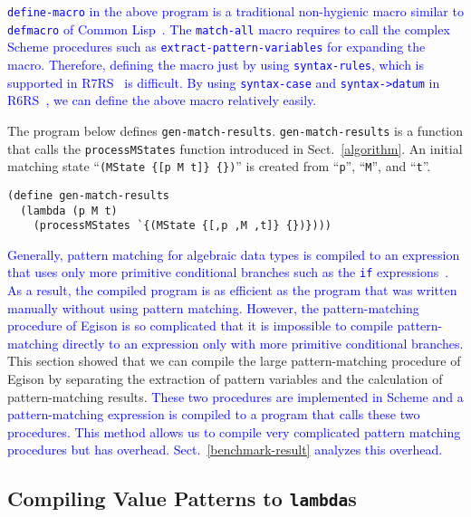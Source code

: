 \documentclass[acmlarge]{acmart}
\newcommand{\new}[1]{\textcolor{blue}{#1}}
\begin{document}
\noindent
\new{
\lstinline{define-macro} in the above program is a traditional non-hygienic macro similar to \lstinline{defmacro} of Common Lisp~\cite{gaucheTM}.
The \lstinline{match-all} macro requires to call the complex Scheme procedures such as \lstinline{extract-pattern-variables} for expanding the macro.
Therefore, defining the macro just by using \lstinline{syntax-rules}, which is supported in R7RS~\cite{shinn2013revised} is difficult.
By using \lstinline{syntax-case} and \lstinline{syntax->datum} in R6RS~\cite{sperber2009revised}, we can define the above macro relatively easily.
}%

The program below defines \lstinline{gen-match-results}.
\lstinline{gen-match-results} is a function that calls the \lstinline{processMStates} function introduced in Sect.~\ref{algorithm}.
An initial matching state ``\lstinline|(MState {[p M t]} {})|'' is created from ``\lstinline{p}'', ``\lstinline{M}'', and ``\lstinline{t}''.

\begin{lstlisting}[language=egison]
(define gen-match-results
  (lambda (p M t)
    (processMStates `{(MState {[,p ,M ,t]} {})})))
\end{lstlisting}

\medskip

\new{
Generally, pattern matching for algebraic data types is compiled to an expression that uses only more primitive conditional branches such as the \texttt{if} expressions~\cite{peyton1987implementation}.
As a result, the compiled program is as efficient as the program that was written manually without using pattern matching.  
However, the pattern-matching procedure of Egison is so complicated that it is impossible to compile pattern-matching directly to an expression only with more primitive conditional branches.
}%
This section showed that we can compile the large pattern-matching procedure of Egison by separating the extraction of pattern variables and the calculation of pattern-matching results.
\new{
These two procedures are implemented in Scheme and a pattern-matching expression is compiled to a program that calls these two procedures.
This method allows us to compile very complicated pattern matching procedures but has overhead.
Sect.~\ref{benchmark-result} analyzes this overhead.
}%

\subsection{Compiling Value Patterns to \lstinline{lambda}s}\label{method-val-pat}
\end{document}

